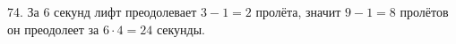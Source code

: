74. За 6 секунд лифт преодолевает $3-1=2$ пролёта, значит $9-1=8$ пролётов он преодолеет за $6\cdot4=24$ секунды.\\
